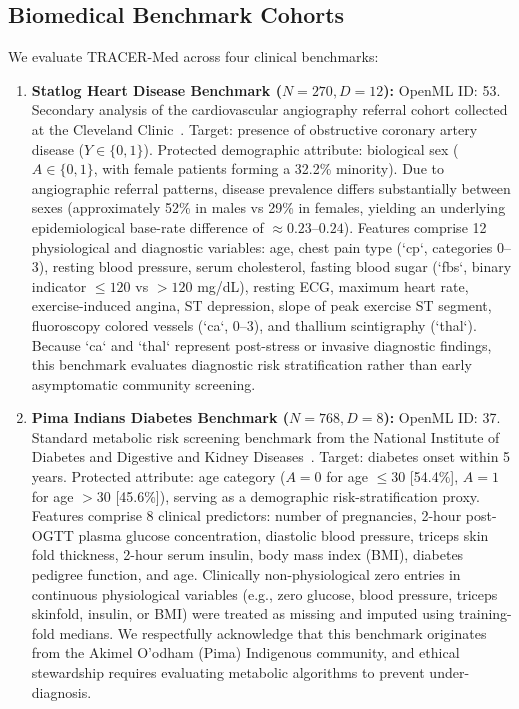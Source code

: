\documentclass[3p,12pt]{elsarticle}
\theoremstyle{plain}
\theoremstyle{definition}
\begin{document}
\subsection{Biomedical Benchmark Cohorts}
We evaluate TRACER-Med across four clinical benchmarks:
\begin{enumerate}
    \item \textbf{Statlog Heart Disease Benchmark ($N=270, D=12$):} OpenML ID: 53. Secondary analysis of the cardiovascular angiography referral cohort collected at the Cleveland Clinic~\cite{detrano1989international}. Target: presence of obstructive coronary artery disease ($Y \in \{0, 1\}$). Protected demographic attribute: biological sex ($A \in \{0, 1\}$, with female patients forming a 32.2\% minority). Due to angiographic referral patterns, disease prevalence differs substantially between sexes (approximately 52\% in males vs 29\% in females, yielding an underlying epidemiological base-rate difference of $\approx 0.23$--$0.24$). Features comprise 12 physiological and diagnostic variables: age, chest pain type (`cp`, categories 0--3), resting blood pressure, serum cholesterol, fasting blood sugar (`fbs`, binary indicator $\le 120$ vs $>120$ mg/dL), resting ECG, maximum heart rate, exercise-induced angina, ST depression, slope of peak exercise ST segment, fluoroscopy colored vessels (`ca`, 0--3), and thallium scintigraphy (`thal`). Because `ca` and `thal` represent post-stress or invasive diagnostic findings, this benchmark evaluates diagnostic risk stratification rather than early asymptomatic community screening.
    \item \textbf{Pima Indians Diabetes Benchmark ($N=768, D=8$):} OpenML ID: 37. Standard metabolic risk screening benchmark from the National Institute of Diabetes and Digestive and Kidney Diseases~\cite{smith1988using}. Target: diabetes onset within 5 years. Protected attribute: age category ($A = 0$ for age $\le 30$ [54.4\%], $A = 1$ for age $> 30$ [45.6\%]), serving as a demographic risk-stratification proxy. Features comprise 8 clinical predictors: number of pregnancies, 2-hour post-OGTT plasma glucose concentration, diastolic blood pressure, triceps skin fold thickness, 2-hour serum insulin, body mass index (BMI), diabetes pedigree function, and age. Clinically non-physiological zero entries in continuous physiological variables (e.g., zero glucose, blood pressure, triceps skinfold, insulin, or BMI) were treated as missing and imputed using training-fold medians. We respectfully acknowledge that this benchmark originates from the Akimel O'odham (Pima) Indigenous community, and ethical stewardship requires evaluating metabolic algorithms to prevent under-diagnosis.

\end{enumerate}
\end{document}
